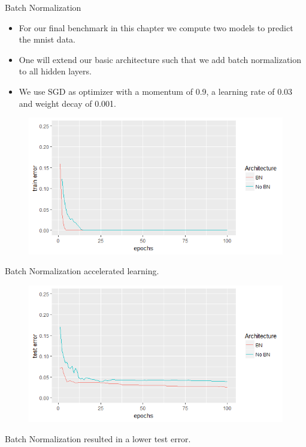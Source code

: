 \begin{vbframe}{Batch Normalization}
\begin{itemize}
    \item For our final benchmark in this chapter we compute two models to predict the mnist data.
    \item One will extend our basic architecture such that we add batch normalization to all hidden layers.
    \item We use SGD as optimizer with  a momentum of 0.9, a learning rate of 0.03 and weight decay of 0.001.
  \end{itemize}

\framebreak


  \begin{figure}
  \centering
    \includegraphics[width=12cm]{plots/bnTrain.png}
  \end{figure}
  Batch Normalization accelerated learning. 
  
  
\framebreak
  
  \begin{figure}
  \centering
    \includegraphics[width=12cm]{plots/bnTest.png}
  \end{figure}
  Batch Normalization resulted in a lower test error. 
\end{vbframe}

